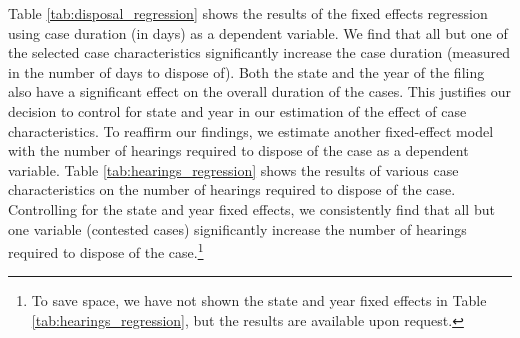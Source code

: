 \documentclass[12pt,a4paper]{article}
\begin{document}
	Table \ref{tab:disposal_regression} shows the results of the fixed effects regression using case duration (in days) as a dependent variable. We find that all but one of the selected case characteristics significantly increase the case duration (measured in the number of days to dispose of). Both the state and the year of the filing also have a significant effect on the overall duration of the cases. This justifies our decision to control for state and year in our estimation of the effect of case characteristics. To reaffirm our findings, we estimate another fixed-effect model with the number of hearings required to dispose of the case as a dependent variable. Table \ref{tab:hearings_regression} shows the results of various case characteristics on the number of hearings required to dispose of the case. Controlling for the state and year fixed effects, we consistently find that all but one variable (contested cases) significantly increase the number of hearings required to dispose of the case.\footnote{To save space, we have not shown the state and year fixed effects in Table \ref{tab:hearings_regression}, but the results are available upon request.} 
	
\end{document}
